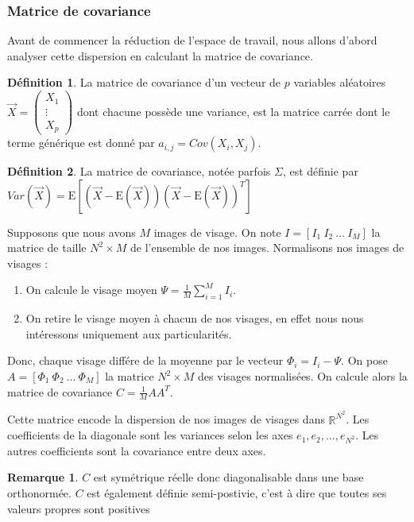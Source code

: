 \documentclass[12pt,french]{article}
\theoremstyle{plain}
\theoremstyle{definition}
\newtheorem{defi}{Définition}
\newtheorem{rmq}{Remarque}
\begin{document}
\subsubsection{Matrice de covariance}
Avant de commencer la réduction de l'espace de travail, nous allons d'abord analyser cette dispersion en calculant la matrice de covariance.

\begin{defi}
  La matrice de covariance d'un vecteur de $p$ variables aléatoires $\overrightarrow{X} =
  \begin{pmatrix}
    X_1 \\
    \vdots \\
    X_p
  \end{pmatrix}$ dont chacune possède une variance, est la matrice carrée dont le terme générique est donné par $a_{i,j} = Cov(X_i,X_j)$.
\end{defi}
\begin{defi}
  La matrice de covariance, notée parfois $\Sigma$, est définie par $Var(\overrightarrow{X}) = \mathrm{E}[ (\overrightarrow{X}-\mathrm{E}(\overrightarrow{X})) (\overrightarrow{X}-\mathrm{E}(\overrightarrow{X}))^T]$
\end{defi}

Supposons que nous avons $M$ images de visage. On note $I = [I_1~I_2~\dots~I_M]$ la matrice de taille $N^2 \times M$ de l'ensemble de nos images. Normalisons nos images de visages :
\begin{enumerate}
\item On calcule le visage moyen $\Psi = \frac{1}{M}\displaystyle\sum_{i=1}^{M} I_i$.
\item On retire le visage moyen à chacun de nos visages, en effet nous nous intéressons uniquement aux particularités.
\end{enumerate}
Donc, chaque visage différe de la moyenne par le vecteur $\Phi_i = I_i - \Psi$. On pose $A = [\Phi_1~\Phi_2~\dots~\Phi_M]$ la matrice $N^2 \times M$ des visages normalisées.
On calcule alors la matrice de covariance $C = \frac{1}{M}AA^T$.

Cette matrice encode la dispersion de nos images de visages dans $\mathbb{R}^{N^2}$. Les coefficients de la diagonale sont les variances selon les axes $e_1, e_2, \dots, e_{N^2}$.
Les autres coefficients sont la covariance entre deux axes.

\begin{rmq}
  $C$ est symétrique réelle donc diagonalisable dans une base orthonormée. $C$ est également définie semi-postivie, c'est à dire que toutes ses valeurs propres sont positives
\end{rmq}
\end{document}
